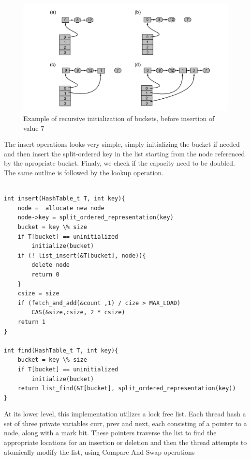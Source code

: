 \begin{figure}
 \centering
  \includegraphics[scale=0.5]{split_ordered_3.png}
\caption{Example of recursive initialization of buckets, before insertion of value 7}
\label{split_ordered_3}
\end{figure}

The insert operations looks very simple, simply initializing the bucket if needed and then insert the split-ordered key in the list starting from the node referenced by the apropriate bucket. Finaly, we check if the capacity need to be doubled. The same outline is followed by the lookup operation.

\begin{lstlisting}

int insert(HashTable_t T, int key){
	node =  allocate new node
	node->key = split_ordered_representation(key)
	bucket = key \% size
	if T[bucket] == uninitialized
		initialize(bucket)
	if (! list_insert(&T[bucket], node)){
		delete node
		return 0
	}
	csize = size
	if (fetch_and_add(&count ,1) / cize > MAX_LOAD)
		CAS(&size,csize, 2 * csize)
	return 1
}

int find(HashTable_t T, int key){
	bucket = key \% size
	if T[bucket] == uninitialized
		initialize(bucket)
	return list_find(&T[bucket], split_ordered_representation(key))
}

\end{lstlisting}

At its lower level, this implementation utilizes a lock free list. Each thread hash a set of three private variables curr, prev and next, each consisting of a pointer to a node, along with a mark bit. These pointers traverse the list to find the appropriate locations for an insertion or deletion and then the thread attempts to atomically modify the list, using Compare And Swap operations

